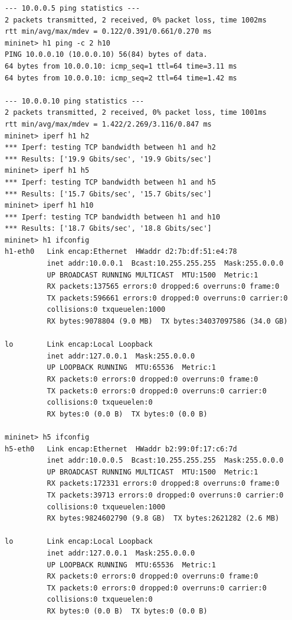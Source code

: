 \documentclass[a4paper, 11pt]{article}
\begin{document}
\begin{appendices}
\begin{lstlisting}[style=BashInputStyle]
--- 10.0.0.5 ping statistics ---
2 packets transmitted, 2 received, 0% packet loss, time 1002ms
rtt min/avg/max/mdev = 0.122/0.391/0.661/0.270 ms
mininet> h1 ping -c 2 h10
PING 10.0.0.10 (10.0.0.10) 56(84) bytes of data.
64 bytes from 10.0.0.10: icmp_seq=1 ttl=64 time=3.11 ms
64 bytes from 10.0.0.10: icmp_seq=2 ttl=64 time=1.42 ms

--- 10.0.0.10 ping statistics ---
2 packets transmitted, 2 received, 0% packet loss, time 1001ms
rtt min/avg/max/mdev = 1.422/2.269/3.116/0.847 ms
mininet> iperf h1 h2
*** Iperf: testing TCP bandwidth between h1 and h2
*** Results: ['19.9 Gbits/sec', '19.9 Gbits/sec']
mininet> iperf h1 h5
*** Iperf: testing TCP bandwidth between h1 and h5
*** Results: ['15.7 Gbits/sec', '15.7 Gbits/sec']
mininet> iperf h1 h10
*** Iperf: testing TCP bandwidth between h1 and h10
*** Results: ['18.7 Gbits/sec', '18.8 Gbits/sec']
mininet> h1 ifconfig
h1-eth0   Link encap:Ethernet  HWaddr d2:7b:df:51:e4:78
          inet addr:10.0.0.1  Bcast:10.255.255.255  Mask:255.0.0.0
          UP BROADCAST RUNNING MULTICAST  MTU:1500  Metric:1
          RX packets:137565 errors:0 dropped:6 overruns:0 frame:0
          TX packets:596661 errors:0 dropped:0 overruns:0 carrier:0
          collisions:0 txqueuelen:1000
          RX bytes:9078804 (9.0 MB)  TX bytes:34037097586 (34.0 GB)

lo        Link encap:Local Loopback
          inet addr:127.0.0.1  Mask:255.0.0.0
          UP LOOPBACK RUNNING  MTU:65536  Metric:1
          RX packets:0 errors:0 dropped:0 overruns:0 frame:0
          TX packets:0 errors:0 dropped:0 overruns:0 carrier:0
          collisions:0 txqueuelen:0
          RX bytes:0 (0.0 B)  TX bytes:0 (0.0 B)

mininet> h5 ifconfig
h5-eth0   Link encap:Ethernet  HWaddr b2:99:0f:17:c6:7d
          inet addr:10.0.0.5  Bcast:10.255.255.255  Mask:255.0.0.0
          UP BROADCAST RUNNING MULTICAST  MTU:1500  Metric:1
          RX packets:172331 errors:0 dropped:8 overruns:0 frame:0
          TX packets:39713 errors:0 dropped:0 overruns:0 carrier:0
          collisions:0 txqueuelen:1000
          RX bytes:9824602790 (9.8 GB)  TX bytes:2621282 (2.6 MB)

lo        Link encap:Local Loopback
          inet addr:127.0.0.1  Mask:255.0.0.0
          UP LOOPBACK RUNNING  MTU:65536  Metric:1
          RX packets:0 errors:0 dropped:0 overruns:0 frame:0
          TX packets:0 errors:0 dropped:0 overruns:0 carrier:0
          collisions:0 txqueuelen:0
          RX bytes:0 (0.0 B)  TX bytes:0 (0.0 B)


\end{lstlisting}
\end{appendices}
\end{document}
